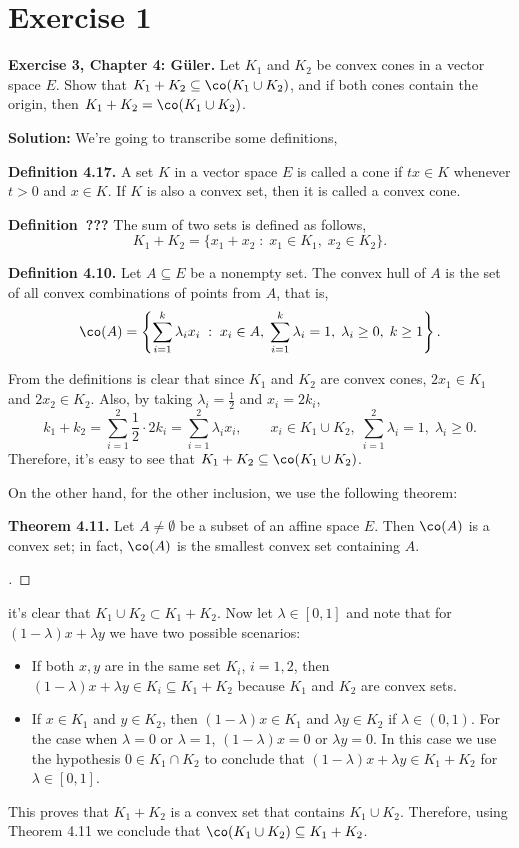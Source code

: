 

\section*{Exercise 1}

\textbf{Exercise 3, Chapter 4: Güler.} Let $K_1$ and $K_2$ be convex cones in a vector space $E$. Show that $K_1 + K_2\subseteq \co(K_1\cup K_2)$, and if both cones contain the origin, then $K_1 + K_2 = \co(K_1\cup K_2)$.

\textbf{Solution:} We're going to transcribe some definitions,

\textbf{Definition 4.17.} A set $K$ in a vector space $E$ is called a cone if $tx \in K$ whenever $t > 0$ and $x \in K$. If $K$ is also a convex set, then it is called a convex cone.

\textbf{Definition~???} The sum of two sets is defined as follows,
\[ K_1+K_2 = \{x_1+x_2 \;:\; x_1 \in K_1,\; x_2 \in K_2\}. \]

\textbf{Definition 4.10.} Let $A \subseteq E$ be a nonempty set. The convex hull of $A$ is the set of all convex combinations of points from $A$, that is,
\[ \co(A) = \left\{ \sum_{i = 1}^{k}\lambda_i x_i \;:\; x_i \in A,\; \sum_{i = 1}^{k} \lambda_i = 1,\; \lambda_i \geq 0,\; k\geq 1 \right\}. \]

From the definitions is clear that since $K_1$ and $K_2$ are convex cones, $2x_1 \in K_1$ and $2x_2 \in K_2$. Also, by taking $\lambda_i = \frac{1}{2}$ and $x_i = 2k_i$,
\[ k_1 + k_2 = \sum_{i = 1}^{2} \frac{1}{2} \cdot 2 k_i = \sum_{i = 1}^{2} \lambda_i x_i,\hspace{2em} x_i \in K_1 \cup K_2,\; \sum_{i = 1}^2 \lambda_i = 1,\; \lambda_i \geq 0 .\]
Therefore, it's easy to see that $K_1+K_2 \subseteq \co(K_1\cup K_2)$.

On the other hand, for the other inclusion, we use the following theorem:

\textbf{Theorem 4.11.} Let $A \neq \emptyset$ be a subset of an affine space $E$. Then $\co(A)$ is a convex set; in fact, $\co(A)$ is the smallest convex set containing $A$.
\begin{proof}[]
\end{proof}

it's clear that $K_1 \cup K_2 \subset K_1+K_2$. Now let $\lambda \in [0,1]$ and note that for $(1-\lambda) x + \lambda y$ we have two possible scenarios:
\begin{itemize}
    \item If both $x,y$ are in the same set $K_i$, $i = 1,2$, then $(1-\lambda) x + \lambda y\in K_i \subseteq K_1+K_2$ because $K_1$ and $K_2$ are convex sets.
    \item If $x \in K_1$ and $y \in K_2$, then $(1-\lambda) x \in K_1$ and $\lambda y \in K_2$ if $\lambda \in (0,1)$. For the case when $\lambda = 0$ or $\lambda = 1$, $(1-\lambda) x = 0$ or $\lambda y = 0$. In this case we use the hypothesis $0 \in K_1 \cap K_2$ to conclude that $(1-\lambda) x + \lambda y \in K_1 + K_2$ for $\lambda \in [0,1]$.
\end{itemize}

This proves that $K_1 + K_2$ is a convex set that contains $K_1\cup K_2$. Therefore, using Theorem 4.11 we conclude that $\co(K_1\cup K_2) \subseteq K_1+ K_2$.